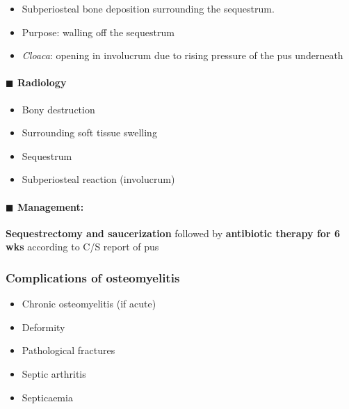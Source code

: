 \documentclass[
  14pt,
]{extarticle}
\providecommand{\tightlist}{%
  \setlength{\itemsep}{0pt}\setlength{\parskip}{0pt}}
\begin{document}
\begin{itemize}
\tightlist
\item
  Subperiosteal bone deposition surrounding the sequestrum.
\item
  Purpose: walling off the sequestrum
\item
  \emph{Cloaca}: opening in involucrum due to rising pressure of the pus
  underneath
\end{itemize}

\hypertarget{blacksquare-radiology-1}{%
\paragraph{\texorpdfstring{\(\blacksquare\)
Radiology}{\textbackslash blacksquare Radiology}}\label{blacksquare-radiology-1}}

\begin{itemize}
\tightlist
\item
  Bony destruction
\item
  Surrounding soft tissue swelling
\item
  Sequestrum
\item
  Subperiosteal reaction (involucrum)
\end{itemize}

\hypertarget{blacksquare-management}{%
\paragraph{\texorpdfstring{\(\blacksquare\)
Management:}{\textbackslash blacksquare Management:}}\label{blacksquare-management}}

\textbf{Sequestrectomy and saucerization} followed by \textbf{antibiotic
therapy for 6 wks} according to C/S report of pus

\hypertarget{complications-of-osteomyelitis}{%
\subsubsection{Complications of
osteomyelitis}\label{complications-of-osteomyelitis}}

\begin{itemize}
\tightlist
\item
  Chronic osteomyelitis (if acute)
\item
  Deformity
\item
  Pathological fractures
\item
  Septic arthritis
\item
  Septicaemia
\end{itemize}
\end{document}
